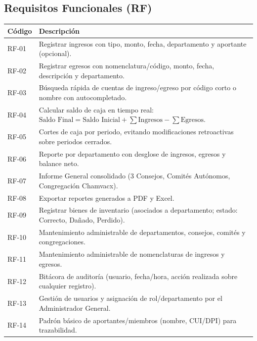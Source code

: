\documentclass[11pt,a4paper]{article}
\begin{document}
	\subsection{Requisitos Funcionales (RF)}
	\begin{table}[h!]
		\centering
		\renewcommand{\arraystretch}{1.1}
		\begin{tabularx}{\textwidth}{l X}
			\toprule
			\textbf{Código} & \textbf{Descripción} \\
			\midrule
			RF-01 & Registrar ingresos con tipo, monto, fecha, departamento y aportante (opcional). \\
			RF-02 & Registrar egresos con nomenclatura/código, monto, fecha, descripción y departamento. \\
			RF-03 & Búsqueda rápida de cuentas de ingreso/egreso por código corto o nombre con autocompletado. \\
			RF-04 & Calcular saldo de caja en tiempo real: $\text{Saldo Final} = \text{Saldo Inicial} + \sum \text{Ingresos} - \sum \text{Egresos}$. \\
			RF-05 & Cortes de caja por periodo, evitando modificaciones retroactivas sobre periodos cerrados. \\
			RF-06 & Reporte por departamento con desglose de ingresos, egresos y balance neto. \\
			RF-07 & Informe General consolidado (3 Consejos, Comités Autónomos, Congregación Chamvacx). \\
			RF-08 & Exportar reportes generados a PDF y Excel. \\
			RF-09 & Registrar bienes de inventario (asociados a departamento; estado: Correcto, Dañado, Perdido). \\
			RF-10 & Mantenimiento administrable de departamentos, consejos, comités y congregaciones. \\
			RF-11 & Mantenimiento administrable de nomenclaturas de ingresos y egresos. \\
			RF-12 & Bitácora de auditoría (usuario, fecha/hora, acción realizada sobre cualquier registro). \\
			RF-13 & Gestión de usuarios y asignación de rol/departamento por el Administrador General. \\
			RF-14 & Padrón básico de aportantes/miembros (nombre, CUI/DPI) para trazabilidad. \\
			\bottomrule
		\end{tabularx}
	\end{table}
	
\end{document}
